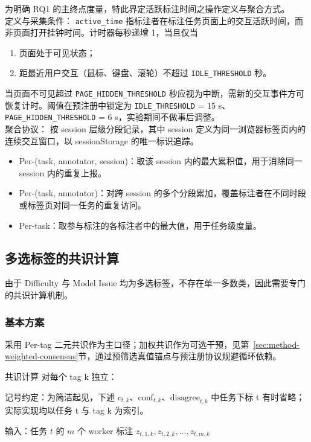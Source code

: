 为明确 RQ1 的主终点度量，特此界定活跃标注时间之操作定义与聚合方式。
\\ 定义与采集条件：
\texttt{active\_time} 指标注者在标注任务页面上的交互活跃时间，而非页面打开挂钟时间。计时器每秒递增 1，当且仅当
\begin{enumerate}
    \item 页面处于可见状态；
    \item 距最近用户交互（鼠标、键盘、滚轮）不超过 \texttt{IDLE\_THRESHOLD} 秒。
\end{enumerate}
当页面不可见超过 \texttt{PAGE\_HIDDEN\_THRESHOLD} 秒应视为中断，需新的交互事件方可恢复计时。阈值在预注册中锁定为 \texttt{IDLE\_THRESHOLD} = 15 s、\texttt{PAGE\_HIDDEN\_THRESHOLD} = 6 s，实验期间不做事后调整。
\\ 聚合协议：
按 session 层级分段记录，其中 session 定义为同一浏览器标签页内的连续交互窗口，以 sessionStorage 的唯一标识追踪。
\begin{itemize}
    \item Per-(task, annotator, session)：取该 session 内的最大累积值，用于消除同一 session 内的重复上报。
    \item Per-(task, annotator)：对跨 session 的多个分段累加，覆盖标注者在不同时段或标签页对同一任务的重复访问。
    \item Per-task：取参与标注的各标注者中的最大值，用于任务级度量。
\end{itemize}

\subsection{多选标签的共识计算}\label{sec:method-tags-consensus}

由于 Difficulty 与 Model Issue 均为多选标签，不存在单一多数类，因此需要专门的共识计算机制。

\subsubsection{基本方案}
采用 Per-tag 二元共识作为主口径；加权共识作为可选干预，见第~\ref{sec:method-weighted-consensus}节，通过预筛选真值锚点与预注册协议规避循环依赖。

共识计算 对每个 tag k 独立：

记号约定：为简洁起见，下述 $c_{t,k}$、$\mathrm{conf}_{t,k}$、$\mathrm{disagree}_{t,k}$ 中任务下标 t 有时省略；实际实现均以任务 t 与 tag k 为索引。

输入：任务 $t$ 的 $m$ 个 worker 标注 $z_{t,1,k},z_{t,2,k},\ldots,z_{t,m,k}$

